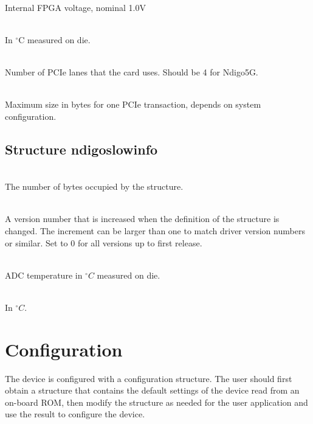             \\
            Internal FPGA voltage, nominal 1.0V\par

            \\
            In $^\circ$C measured on die.\par

            \\
            Number of PCIe lanes that the card uses. Should be 4 for Ndigo5G. \par

            \\
            Maximum size in bytes for one PCIe transaction, depends on system configuration.\par

        \subsection{Structure ndigo\tu slow\tu info}

            \\
            The number of bytes occupied by the structure.\par

            \\
            A version number that is increased when the definition of the structure is changed. The increment can be larger than one to match driver version numbers or similar. Set to 0 for all versions up to
first release.\par

            \\
            ADC temperature in $^{\circ}C$ measured on die.\par

            \\
            In $^{\circ}C$.

    \section{Configuration}

        The device is configured with a configuration structure. The user should first obtain a structure that contains the default settings of the device read from an on-board ROM, then modify the structure as needed for the user application and use the result to configure the device.\par

